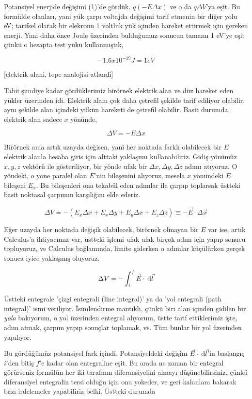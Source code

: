 \documentclass[12pt,fleqn]{article}\usepackage{../../common}
\begin{document}
Potansiyel enerjide değişimi (1)'de gördük. $q (-E \Delta x )$ ve o da $q \Delta
V$'ya eşit. Bu formülde olanları, yani yük çarpı voltajda değişimi tarif etmenin
bir diğer yolu eV; tarifsel olarak bir elekronu 1 voltluk yük içinden hareket
ettirmek için gereken enerji. Yani daha önce Joule üzerinden bulduğumuz sonucun
tamamı 1 eV'ye eşit çünkü o hesapta test yükü kullanmıştık,

$$
-1.6 x 10^{-19} J = 1 eV
$$

[elektrik alani, tepe analojisi atlandi]

Tabii şimdiye kadar gördüklerimiz birörnek elektrik alan ve düz hareket eden
yükler üzerinden idi. Elektrik alanı çok daha çetrefil şekilde tarif ediliyor
olabilir, aynı şekilde alan içindeki yükün hareketi de çetrefil olabilir. Basit
durumda, elektrik alan sadece $x$ yönünde,

$$
\Delta V = -E \Delta x
$$

Birörnek ama artık uzayda değisen, yani her noktada farklı olabilecek bir $E$
elektrik alanla hesaba giris için alttaki yaklaşımı kullanabiliriz. Gidiş
yönümüz $x,y,z$ vektörü ile gösteriliyor, bir yönde ufak bir $\Delta x, \Delta
y, \Delta z$ adımı atıyoruz. O yöndeki, o yöne paralel olan $E$'nin bileşenini
alıyoruz, mesela $x$ yönündeki $E$ bileşeni $E_x$. Bu bileşenleri ona tekabül
eden adımlar ile çarpıp toplarsak üstteki basit noktasal çarpımın karşılığını
elde ederiz.

$$
\Delta V =
-(E_x \Delta x + E_x \Delta y + E_y \Delta x + E_z \Delta z ) \equiv
-\vec{E} \cdot \Delta \vec{x}
$$

Eğer uzayda her noktada değişik olabilecek, birörnek olmayan bir $E$ var ise,
artık Calculus'a ihtiyacımız var, üstteki işlemi ufak ufak birçok adım için
yapıp sonucu topluyoruz, ve Calculus bağlamında, limite giderken o adımlar
küçülürken gerçek sonuca iyice yaklaşmış oluyoruz.

$$
\Delta V = -\int _{i}^{f} \vec{E} \cdot \,\mathrm{d} \vec{l}
$$

Üstteki entegrale 'çizgi entegrali (line integral)' ya da 'yol entegrali (path
integral)' ismi veriliyor. İsimlendirme mantıklı, çünkü biri alan içinden
gidilen bir {\em yola} bakıyorum, o yol üzerinden entegral alıyorum, üstte tarif
ettiklerimiz işte, adım atmak, çarpım yapıp sonuçlar toplamak, vs. Tüm bunlar
bir yol üzerinden yapılıyor. 

Bu gördüğümüz potansiyel fark içindi. Potansiyeldeki değişim $\vec{E} \cdot
\,\mathrm{d}\vec{l}$'in baslangıç $i$'den bitiş $f$'e kadar olan entegraline eşit. Bu
arada ne zaman bir entegral görürseniz formülün her iki tarafının
diferansiyelini almayı düşünebilirsiniz, çünkü diferansiyel entegralin tersi
olduğu için onu yokeder, ve geri kalanlara bakarak bazı irdelemeler yapabiliriz
belki. Üstteki durumda
\end{document}
